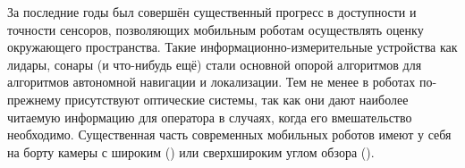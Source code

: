 
За последние годы был совершён существенный прогресс в доступности и точности сенсоров, позволяющих 
мобильным роботам осуществлять оценку окружающего пространства. Такие информационно-измерительные устройства
как лидары, сонары (и что-нибудь ещё) стали основной опорой алгоритмов для алгоритмов автономной навигации и локализации.
Тем не менее в роботах по-прежнему присутствуют оптические системы, так как они дают наиболее читаемую информацию для 
оператора в случаях, когда его вмешательство необходимо.   Существенная часть современных мобильных роботов имеют у себя на 
борту камеры с широким () или сверхшироким углом обзора ().  \cite{Hartley2004}